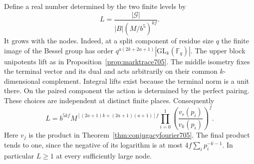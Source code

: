 \documentclass[a4paper,11pt]{article}
\theoremstyle{definition}
\theoremstyle{remark}
\numberwithin{equation}{section}
\begin{document}
Define a real number determined by the two finite levels by
\[
             L=\frac{|\mathcal G|}{|B|(M/b^5)^{kf}} .
\]
It grows with the nodes. Indeed, at a split component of
residue size \(q\) the finite image of the Bessel group
has order \(q^{a(2k+2a+1)}|\mathrm{GL}_k(\mathbb F_q)|\).
The upper block unipotents lift as in
Proposition~\ref{prop:marktrace705}. The middle isometry
fixes the terminal vector and its dual and acts arbitrarily
on their common \(k\)-dimensional complement. Integral lifts
exist because the terminal norm is a unit there. On the
paired component the action is determined by the perfect
pairing. These choices are independent at distinct finite
places. Consequently
\[
 L=b^{5kf}M^{[(2a+1)k+(2a+1)(a+1)]f}
             \prod_{i=0}^1\left(\frac{v_r(p_i)}{v_k(p_i)}\right)^f .
\]
Here \(v_j\) is the product in Theorem~\ref{thm:conjugacyfourier705}.
The final product tends to one, since the negative of its
logarithm is at most \(4f\sum_i p_i^{-k-1}\). In particular
\(L\ge1\) at every sufficiently large node.
\end{document}
